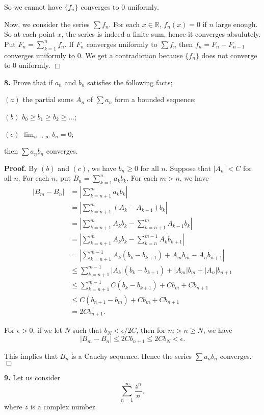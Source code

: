 \documentclass{article}
\begin{document}
So we cannot have $\{f_n\}$ converges to $0$ uniformly.

Now, we consider the series $\sum f_n$. For each $x\in \mathbb{R}$,
$f_n(x) = 0$ if $n$ large enough. So at each point $x$, the series is
indeed a finite sum, hence it converges absulutely. Put
$F_n = \sum_{k=1}^n f_n$. If $F_n$ converges uniformly to $\sum f_n$
then $f_n = F_n - F_{n-1}$ converges uniformly to $0$. We get a
contradiction because $\{f_n\}$ does not converge to $0$ uniformly.
$\Box$

    \textbf{8.} Prove that if $a_n$ and $b_n$ satisfies the following facts;

$(a)$ the partial sums $A_n$ of $\sum a_n$ form a bounded sequence;

$(b)$ $b_0\ge b_1\ge b_2\ge \ldots$;

$(c)$ $\lim_{n\to\infty}b_n = 0$;

then $\sum a_nb_n$ converges.

\textbf{Proof.} By $(b)$ and $(c)$, we have $b_n \ge 0$ for all $n$.
Suppose that $|A_n| < C$ for all $n$. For each $n$, put
$B_n = \sum_{k=1}^na_kb_k$. For each $m > n$, we have \[\begin{aligned}
|B_m-B_n| &= \left|\sum_{k=n+1}^ma_kb_k\right|\\
&= \left| \sum_{k=n+1}^m (A_k-A_{k-1})b_k\right|\\
&= \left| \sum_{k=n+1}^m A_kb_k -\sum_{k=n+1}^{m}A_{k-1}b_k\right|\\
&= \left| \sum_{k=n+1}^m A_kb_k - \sum_{k=n}^{m-1} A_kb_{k+1}\right|\\
&= \left| \sum_{k=n+1}^{m-1}A_k(b_k-b_{k+1}) + A_mb_m - A_nb_{n+1}\right|\\
&\le \sum_{k=n+1}^{m-1} |A_k|(b_k-b_{k+1}) + |A_m|b_m + |A_n|b_{n+1}\\
&\le \sum_{k=n+1}^{m-1} C(b_k- b_{k+1}) + Cb_m + Cb_{n+1} \\
&\le C(b_{n+1} -b_m) + Cb_m +Cb_{n+1} \\
& = 2Cb_{n+1}.
\end{aligned}\]

For $\epsilon > 0$, if we let $N$ such that $b_N < \epsilon/2C$, then
for $m > n \ge N$, we have
\[|B_m - B_n| \le 2Cb_{n+1} \le 2Cb_N < \epsilon.\]

This implies that $B_n$ is a Cauchy sequence. Hence the series
$\sum a_nb_n$ converges. $\Box$

    \textbf{9.} Let us consider \[\sum_{n=1}^{\infty}\frac{z^n}{n},\] where
$z$ is a complex number.
\end{document}
